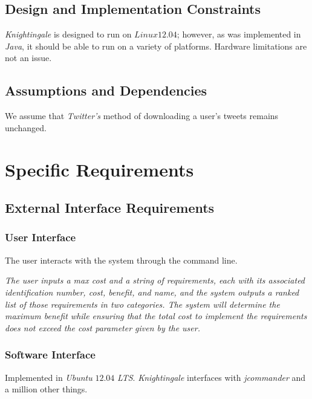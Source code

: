 \documentclass[a4paper, 12pt]{article}
\begin{document}
\subsection{Design and Implementation Constraints} \label{sec:constraints}
\begin{adjustwidth}{2em}{0pt}
\textit{Knightingale} is designed to run on $Linux 12.04$; however, as was implemented in \textit{Java}, it should be able to run on a variety of platforms. Hardware limitations are not an issue.
\end{adjustwidth}

\subsection{Assumptions and Dependencies} \label{sec:and}
\begin{adjustwidth}{2em}{0pt}
We assume that \textit{Twitter’s} method of downloading a user’s tweets remains unchanged. 
\end{adjustwidth}

\section{Specific Requirements} \label{sec:specificreq}
\subsection{External Interface Requirements} \label{sec:eir}
\subsubsection{User Interface} \label{sec:ui}
\begin{adjustwidth}{3em}{0pt}
The user interacts with the system through the command line. \newline

\noindent \textit{The user inputs a max cost and a string of 
requirements, each with its associated identification number, cost, benefit, and name, and the system outputs 
a ranked list of those requirements in two categories. The system will determine the maximum benefit while 
ensuring that the total cost to implement the requirements does not exceed the cost 
parameter given by the user.}
\end{adjustwidth}

\subsubsection{Software Interface} \label{sec:softi}
\begin{adjustwidth}{3em}{0pt}
Implemented in \textit{Ubuntu} $12.04$ \textit{LTS}. \textit{Knightingale} interfaces with \textit{jcommander} and a million other things.
\end{adjustwidth}
\end{document}
